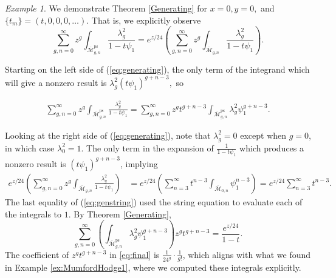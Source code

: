 \documentclass[leqno,12pt]{amsart}
\theoremstyle{remark}
\newtheorem{example}[theorem]{Example}
\numberwithin{equation}{section}
\DeclareMathOperator{\ps}{ps}
\begin{document}
\begin{example}
    We  demonstrate Theorem \ref{Generating} for $x = 0, y = 0,$ and $\{t_m\} = (t, 0, 0, 0, \dots)$. That is, we  explicitly observe \begin{equation}\label{eq:generating}
        \sum_{g, n = 0}^\infty z^g \int_{\overline{\mathcal{M}}^{\ps}_{g, n}} \frac{\lambda_{g}^2}{1 - t\psi_1} = e^{z/24}\left(\sum_{g, n = 0}^\infty z^g \int_{\overline{\mathcal{M}}_{g, n}} \frac{\lambda_{g}^2}{1 - t\psi_1}\right).
    \end{equation}

    Starting on the left side of (\ref{eq:generating}), the only term of the integrand which will give a nonzero result is $\lambda_g^2(t\psi_1)^{g+n-3},$ so 

    \begin{align}\label{eq:genpseudo}
        \sum_{g, n = 0}^\infty z^g \int_{\overline{\mathcal{M}}^{\ps}_{g, n}} \frac{\lambda_{g}^2}{1 - t\psi_1} = \sum_{g, n = 0}^\infty z^g t^{g+n-3}\int_{\overline{\mathcal{M}}^{\ps}_{g, n}} \lambda_g^2\psi_1^{g+n-3}.
    \end{align}

    Looking at the right side of (\ref{eq:generating}), note that $\lambda_g^2 = 0$ except when $g = 0$, in which case $\lambda_0^2 = 1$. The only term in the expansion of $\frac{1}{1-t\psi_1}$ which  produces a nonzero result is $(t\psi_1)^{g+n-3}$, implying
    \begin{align}\label{eq:genstring}
        e^{z/24}\left(\sum_{g, n = 0}^\infty z^g \int_{\overline{\mathcal{M}}_{g, n}} \frac{\lambda_{g}^2}{1 - t\psi_1}\right) &= e^{z/24}\left(\sum_{n = 3}^\infty t^{n-3}\int_{\overline{\mathcal{M}}_{0, n}} \psi_1^{n-3} \right)
        = e^{z/24}\sum_{n = 3}^\infty t^{n-3}.
    \end{align}
    The last equality of (\ref{eq:genstring}) used the string equation \cite{witten1990two} to evaluate each of the integrals to $1$.
By Theorem \ref{Generating}, 
\begin{equation} \label{eq:final}\sum_{g, n = 0}^\infty
    \left(\int_{\overline{\mathcal{M}}^{\ps}_{g, n}} \lambda_g^2\psi_1^{g+n-3}\right)z^g t^{g+n-3} = \frac{e^{z/24}}{1-t}.\end{equation}
    The coefficient of $z^gt^{g+n-3}$ in \eqref{eq:final} is $\frac{1}{24^g}\cdot\frac{1}{g!}$,  which aligns with what we found in Example \ref{ex:MumfordHodge1}, where we computed these integrals explicitly.
\end{example}
    
\end{document}
